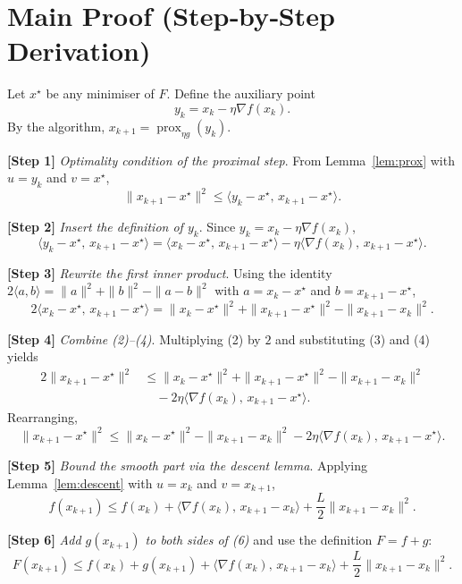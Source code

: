 \documentclass{article}
\newcommand{\prox}{\operatorname{prox}}
\begin{document}
\section*{Main Proof (Step‑by‑Step Derivation)}

Let $x^{\star}$ be any minimiser of $F$. Define the auxiliary point
\[
y_{k}=x_{k}-\eta\nabla f(x_{k}) .
\]
By the algorithm, $x_{k+1}= \prox_{\eta g}(y_{k})$.

\bigskip
\noindent\textbf{[Step 1]}  \textit{Optimality condition of the proximal step}.  
From Lemma~\ref{lem:prox} with $u=y_{k}$ and $v=x^{\star}$,
\[
\|x_{k+1}-x^{\star}\|^{2}
\le \langle y_{k}-x^{\star},\,x_{k+1}-x^{\star}\rangle .
\tag{2}
\]

\noindent\textbf{[Step 2]}  \textit{Insert the definition of $y_{k}$}.  
Since $y_{k}=x_{k}-\eta\nabla f(x_{k})$,
\[
\langle y_{k}-x^{\star},\,x_{k+1}-x^{\star}\rangle
= \langle x_{k}-x^{\star},\,x_{k+1}-x^{\star}\rangle
-\eta\langle \nabla f(x_{k}),\,x_{k+1}-x^{\star}\rangle .
\tag{3}
\]

\noindent\textbf{[Step 3]}  \textit{Rewrite the first inner product}.  
Using the identity $2\langle a,b\rangle =\|a\|^{2}+\|b\|^{2}-\|a-b\|^{2}$ with $a=x_{k}-x^{\star}$ and $b=x_{k+1}-x^{\star}$,
\[
2\langle x_{k}-x^{\star},\,x_{k+1}-x^{\star}\rangle
= \|x_{k}-x^{\star}\|^{2}+\|x_{k+1}-x^{\star}\|^{2}
-\|x_{k+1}-x_{k}\|^{2}.
\tag{4}
\]

\noindent\textbf{[Step 4]}  \textit{Combine (2)–(4)}.  
Multiplying (2) by $2$ and substituting (3) and (4) yields
\[
\begin{aligned}
2\|x_{k+1}-x^{\star}\|^{2}
&\le \|x_{k}-x^{\star}\|^{2}+\|x_{k+1}-x^{\star}\|^{2}
-\|x_{k+1}-x_{k}\|^{2}\\
&\quad -2\eta\langle \nabla f(x_{k}),\,x_{k+1}-x^{\star}\rangle .
\end{aligned}
\]
Rearranging,
\[
\|x_{k+1}-x^{\star}\|^{2}
\le \|x_{k}-x^{\star}\|^{2}
-\|x_{k+1}-x_{k}\|^{2}
-2\eta\langle \nabla f(x_{k}),\,x_{k+1}-x^{\star}\rangle .
\tag{5}
\]

\noindent\textbf{[Step 5]}  \textit{Bound the smooth part via the descent lemma}.  
Applying Lemma~\ref{lem:descent} with $u=x_{k}$ and $v=x_{k+1}$,
\[
f(x_{k+1})\le f(x_{k})+\langle \nabla f(x_{k}),\,x_{k+1}-x_{k}\rangle
+\frac{L}{2}\|x_{k+1}-x_{k}\|^{2}.
\tag{6}
\]

\noindent\textbf{[Step 6]}  \textit{Add $g(x_{k+1})$ to both sides of (6)} and use the definition $F=f+g$:
\[
F(x_{k+1})\le f(x_{k})+g(x_{k+1})+\langle \nabla f(x_{k}),\,x_{k+1}-x_{k}\rangle
+\frac{L}{2}\|x_{k+1}-x_{k}\|^{2}.
\tag{7}
\]
\end{document}
